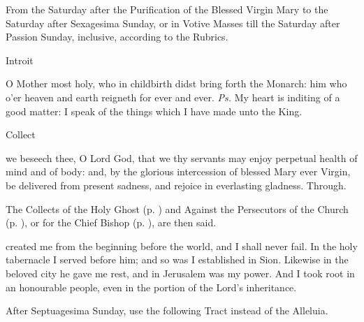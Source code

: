 \begin{rubric}
    {From the Saturday after the Purification of the Blessed Virgin Mary to the Saturday after Sexagesima Sunday, or in Votive Masses till the Saturday after Passion Sunday, inclusive, according to the Rubrics.}
\end{rubric}
\begin{inhead}
    Introit
\end{inhead}
 O Mother most holy, who in childbirth didst bring forth the Monarch: him who o'er heaven and earth reigneth for ever and ever. \textit{Ps.} My heart is inditing of a good matter: I speak of the things which I have made unto the King.
\begin{inhead}
    Collect
\end{inhead}
 we beseech thee, O Lord God, that we thy servants may enjoy perpetual health of mind and of body: and, by the glorious intercession of blessed Mary ever Virgin, be delivered from present sadness, and rejoice in everlasting gladness. Through.
\begin{rubric}
    The Collects of the Holy Ghost (p. \pageref{SPHolyGhost}) and Against the Persecutors of the Church (p. \pageref{SPAgainst}), or for the Chief Bishop (p. \pageref{SPChiefBishop}), are then said.
\end{rubric}
 created me from the beginning before the world, and I shall never fail. In the holy tabernacle I served before him; and so was I established in Sion. Likewise in the beloved city he gave me rest, and in Jerusalem was my power. And I took root in an honourable people, even in the portion of the Lord's inheritance.
\begin{rubric}
    After Septuagesima Sunday, use the following Tract instead of the Alleluia.
\end{rubric}
